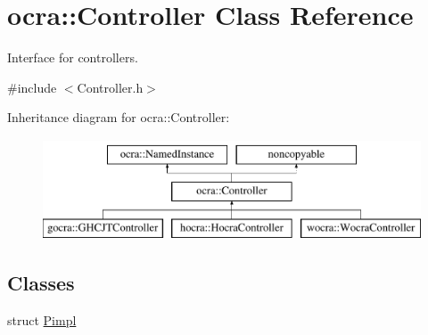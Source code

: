 \hypertarget{classocra_1_1Controller}{}\section{ocra\+:\+:Controller Class Reference}
\label{classocra_1_1Controller}


Interface for controllers.  




{\ttfamily \#include $<$Controller.\+h$>$}

Inheritance diagram for ocra\+:\+:Controller\+:\begin{figure}[H]
\begin{center}
\leavevmode
\includegraphics[height=3.000000cm]{d8/d92/classocra_1_1Controller}
\end{center}
\end{figure}
\subsection*{Classes}
\begin{DoxyCompactItemize}
\item 
struct \hyperlink{structocra_1_1Controller_1_1Pimpl}{Pimpl}
\end{DoxyCompactItemize}
